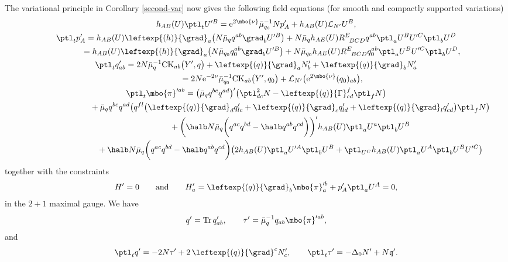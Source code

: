 The variational principle in Corollary \ref{second-var} now gives the following field equations (for smooth and compactly supported variations)
\begin{gather*}
 h_{AB}(U) \ptl_t U'^B= {\rm e}^{2 \mbo{\nu}}\bar{\mu}^{-1}_{q_0} N p'_A + h_{AB}(U) \mathcal{L}_{N'} U^B, \\ %
\ptl_t p'_A = h_{AB} (U) \leftexp{(h)}{\grad}_a \bigl(N \bar{\mu}_{q} q^{ab} \grad_b U'^B\bigr) + N \bar{\mu}_q h_{AE}(U) R^E_{\,\,\,\,BCD} q^{a b} \ptl_a U^B U'^C \ptl_b U^D
\notag\\ \hphantom{\ptl_t p'_A }{}
=h_{AB} (U) \leftexp{(h)}{\grad}_a \bigl(N \bar{\mu}_{q_0} q_0^{ab} \grad_b U'^B\bigr)
+ N \bar{\mu}_{q_0} h_{AE}(U) R^E_{\,\,\,\,BCD} q_0^{a b} \ptl_a U^B U'^C \ptl_b U^D, \\ %
\ptl_t q'_{ab}= 2N \bar{\mu}^{-1}_{q} {\rm CK}_{ab}\bigl(Y', q\bigr)+ \leftexp{(q)}{\grad} _a N'_b + \leftexp{(q)}{\grad}_b N'_a \notag\\
\hphantom{\ptl_t q'_{ab}}{}
= 2N {\rm e}^{-2 \nu} \bar{\mu}^{-1}_{q_0} {\rm CK}_{ab}\bigl(Y', q_0\bigr)+ \mathcal{L}_{N'} \bigl({\rm e}^{ 2 \mbo{\nu}}(q_0)_{ab}\bigr), \\
\ptl_t \mbo{\pi}'^{ab} = \bigl(\bar{\mu}_q q^{bc} q^{ad}\bigr)' \bigl(\ptl^2_{dc} N - \leftexp{(q)}{\Gamma} ^f_{cd} \ptl_f N\bigr) \notag\\
\hphantom{\ptl_t \mbo{\pi}'^{ab} =}
+ \bar{\mu}_q q^{bc} q^{ad} \bigl(q^{fl} \bigl(\leftexp{(q)}{\grad} _d q'_{l c} + \leftexp{(q)}{\grad} _c q'_{l d}+\leftexp{(q)}{\grad} _l q'_{cd}\bigr) \ptl_f N\bigr) \notag\\
\hphantom{\ptl_t \mbo{\pi}'^{ab} =}
+ \biggl(\halb N \bar{\mu}_q \biggl(q^{ac} q^{bd} - \halb q^{ab} q^{cd}\biggr)\biggr)' h_{AB}(U) \ptl_a U^a \ptl_b U^B \notag\\
\hphantom{\ptl_t \mbo{\pi}'^{ab} =}
+ \halb N \bar{\mu}_q \biggl(q^{ac} q^{bd} - \halb q^{ab} q^{cd}\biggr) \bigl(2 h_{AB} (U) \ptl_a U'^A \ptl_b U^B + \ptl_{U^C} h_{AB} (U) \ptl_a U^A \ptl_b U^B U'^C\bigr)
\end{gather*}
together with the constraints
\begin{align*}
H'= 0 \qquad
\text{and}\qquad
H'_a= \leftexp{(q)}{\grad}_b \mbo{\pi}'^b_a + p'_A \ptl_a U^A= 0, %
\end{align*}
in the $2+1$ maximal gauge.
We have
\[
q'= \operatorname{Tr} q'_{ab}, \qquad \tau' = \bar{\mu}^{-1}_q q_{ab} \mbo{\pi}'^{ab},
\]
and
\[
\ptl_t q' = -2N \tau' + 2 \, \leftexp{(q)}{\grad}^c N'_c, \qquad \ptl_t \tau' = - \Delta_0 N' + N \mathfrak{q}'.
\]
